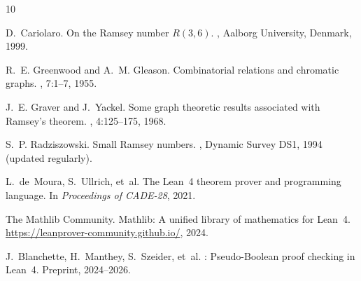 \documentclass[11pt]{article}
\begin{document}

\begin{thebibliography}{10}

D.~Cariolaro.
\newblock On the Ramsey number $R(3,6)$.
, Aalborg University, Denmark, 1999.

R.~E. Greenwood and A.~M. Gleason.
\newblock Combinatorial relations and chromatic graphs.
, 7:1--7, 1955.

J.~E. Graver and J.~Yackel.
\newblock Some graph theoretic results associated with Ramsey's theorem.
, 4:125--175, 1968.

S.~P. Radziszowski.
\newblock Small Ramsey numbers.
, Dynamic Survey DS1,
  1994 (updated regularly).

L.~de~Moura, S.~Ullrich, et~al.
\newblock The {Lean~4} theorem prover and programming language.
\newblock In {\em Proceedings of CADE-28}, 2021.

The Mathlib Community.
\newblock Mathlib: A unified library of mathematics for {Lean~4}.
\newblock \url{https://leanprover-community.github.io/}, 2024.

J.~Blanchette, H.~Manthey, S.~Szeider, et~al.
: Pseudo-Boolean proof checking in {Lean~4}.
\newblock Preprint, 2024--2026.

\end{thebibliography}
\end{document}
